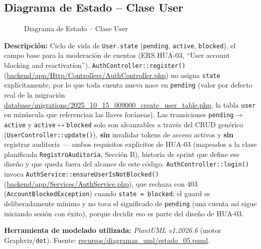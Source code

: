 \subsection{Diagrama de Estado -- Clase User}
\begin{figure}[H]
    \centering
    \caption{Diagrama de Estado -- Clase User}
    \label{fig:estado05}
\end{figure}

{\sloppy\noindent\textbf{Descripción:} Ciclo de vida de \texttt{User.state} (\texttt{pending}, \texttt{active}, \texttt{blocked}), el campo base para la moderación de cuentas (ERS HUA-03, ``User account blocking and reactivation''). \texttt{AuthController::register()} (\url{backend/app/Http/Controllers/AuthController.php}) no asigna \texttt{state} explícitamente, por lo que toda cuenta nueva nace en \texttt{pending} (valor por defecto real de la migración \url{database/migrations/2025_10_15_009000_create_user_table.php}, la tabla \texttt{user} en minúscula que referencian las llaves foráneas). Las transiciones \texttt{pending}$\to$\texttt{active} y \texttt{active}$\leftrightarrow$\texttt{blocked} solo son alcanzables a través del CRUD genérico (\texttt{UserController::update()}), \textbf{sin} invalidar tokens de acceso activos y \textbf{sin} registrar auditoría --- ambos requisitos explícitos de HUA-03 (mapeados a la clase planificada \texttt{RegistroAuditoria}, Sección B), historia de sprint que define ese diseño y que queda fuera del alcance de este código. \texttt{AuthController::login()} invoca \texttt{AuthService::ensureUserIsNotBlocked()} (\url{backend/app/Services/AuthService.php}), que rechaza con 403 (\texttt{AccountBlockedException}) cuando \texttt{state = blocked}; el guard es deliberadamente mínimo y no toca el significado de \texttt{pending} (una cuenta así sigue iniciando sesión con éxito), porque decidir eso es parte del diseño de HUA-03.\par}

\bigskip
{\sloppy\noindent\textbf{Herramienta de modelado utilizada:} \textit{PlantUML v1.2026.6} (motor Graphviz/\texttt{dot}). Fuente: \url{recursos/diagramas_uml/estado_05.puml}.\par}

